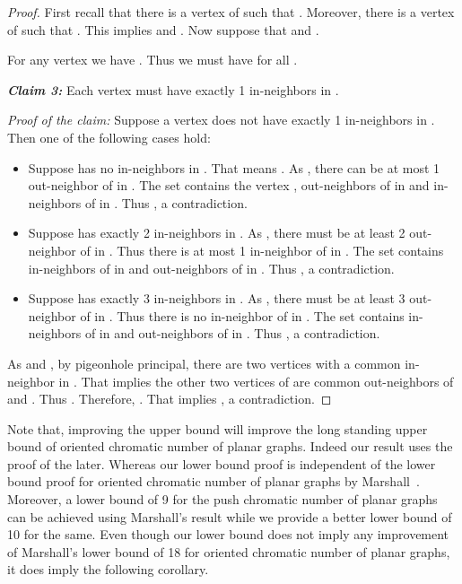 \documentclass[10pt]{article}
\begin{document}
\begin{proof}
 
First recall that there is a vertex  of  such that . Moreover, there is a vertex  of  such that . This implies  and .
Now suppose that  and . 


For any  vertex  we have . 
Thus we must have  for all .


\medskip

\textbf{\textit{Claim 3:}} Each vertex  must have exactly 1 in-neighbors in . 

\medskip

\textit{Proof of the claim:} Suppose a vertex  does not have exactly 1 in-neighbors in . Then one of the following cases hold:

\begin{itemize}
\item[]  Suppose  has no in-neighbors in . That means . As  , there can be  at most 1 out-neighbor of  in . The set  contains the vertex , out-neighbors of  in  and in-neighbors of  in . Thus , a contradiction. 

\item[]  Suppose  has exactly 2 in-neighbors in .  As  , there must be at  least 2 out-neighbor of  in . 
Thus there is at most 1 in-neighbor of  in . The set  contains in-neighbors of  in  and out-neighbors of  in . 
Thus , a contradiction. 


\item[]  Suppose  has exactly 3 in-neighbors in .  As  , there must be at  least 3 out-neighbor of  in . 
Thus there is no in-neighbor of  in . The set  contains in-neighbors of  in  and out-neighbors of  in . 
Thus , a contradiction. \hfill 
\end{itemize}

 
\medskip



As  and , by pigeonhole principal, there are two vertices  with a common in-neighbor in .
That implies the other two vertices of  are common out-neighbors of  and . Thus . 
Therefore, . That implies , a contradiction.
\end{proof}
















Note that, improving the upper bound will improve the long standing 
upper bound of oriented chromatic number of planar graphs. Indeed our result uses the proof of  the later. 
Whereas our lower bound proof is independent of the lower bound proof for oriented chromatic number of planar graphs by Marshall~\cite{marshall18}. 
Moreover, a lower bound of 9 for the push chromatic number of planar graphs can be achieved using Marshall's result 
while we provide a better lower bound of 10 for the same. Even though our lower bound does not imply any improvement of Marshall's lower bound of 18
for oriented chromatic number of planar graphs, it does imply the following corollary.
\end{document}
